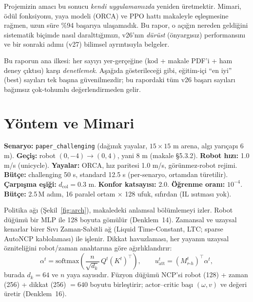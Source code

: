 \documentclass[11pt,a4paper]{article}
\begin{document}
Projemizin amacı bu sonucu \emph{kendi uygulamamızda} yeniden üretmektir. Mimari, ödül fonksiyonu, yaya
modeli (ORCA) ve PPO hattı makaleyle eşleşmesine rağmen, uzun süre \%94 başarıya ulaşamadık. Bu rapor,
o açığın nereden geldiğini sistematik biçimde nasıl daralttığımızı, v26'nın \emph{dürüst} (önyargısız)
performansını ve bir sonraki adımı (v27) bilimsel ayrıntısıyla belgeler.

\begin{kritik}
Bu raporun ana ilkesi: her sayıyı yer-gerçeğine (kod + makale PDF'i + ham deney çıktısı) karşı
\emph{denetlemek}. Aşağıda gösterileceği gibi, eğitim-içi ``en iyi'' (best) sayıları tek başına
güvenilmezdir; bu rapordaki tüm v26 başarı sayıları bağımsız çok-tohumlu değerlendirmeden gelir.
\end{kritik}

\section{Yöntem ve Mimari}

\begin{yontem}
\textbf{Senaryo:} \texttt{paper\_challenging} (dağınık yayalar, $15\times15$ m arena, algı yarıçapı 6 m).
\textbf{Geçiş:} robot $(0,-4)\!\rightarrow\!(0,4)$, yani 8 m (makale §5.3.2). \textbf{Robot hızı:} 1.0 m/s
(unicycle). \textbf{Yayalar:} ORCA, hız paritesi 1.0 m/s, görünmez-robot rejimi. \textbf{Bütçe:}
challenging 50 s, standard 12.5 s (per-senaryo, ortamdan türetilir). \textbf{Çarpışma eşiği:}
$d_{\mathrm{col}}=0.3$ m. \textbf{Konfor katsayısı:} 2.0. \textbf{Öğrenme oranı:} $10^{-4}$.
\textbf{Bütçe:} 2.5\,M adım, 16 paralel ortam $\times$ 128 ufuk, sıfırdan (IL ısıtması yok).
\end{yontem}

Politika ağı (Şekil~\ref{fig:arch}), makaledeki anlamsal bölümlemeyi izler. Robot düğümü bir MLP ile
128 boyuta gömülür (Denklem~14). Zamansal ve uzaysal kenarlar birer Sıvı Zaman-Sabitli ağ (Liquid
Time-Constant, LTC; sparse AutoNCP kablolaması) ile işlenir. Dikkat havuzlaması, her yayanın uzaysal
özniteliğini robot/zaman anahtarına göre ağırlıklandırır:
\begin{equation}
\alpha^t=\mathrm{softmax}\!\left(\frac{n}{\sqrt{d_k}}\,Q^t (K^t)^{\!\top}\right),\qquad
u^t_{\mathrm{att}}=(M^t_{r\text{-}h})^{\!\top}\alpha^t , \tag{Eq.\ 13}
\end{equation}
burada $d_k=64$ ve $n$ yaya sayısıdır. Füzyon düğümü NCP'si robot (128) + zaman (256) + dikkat (256)
$=640$ boyutu birleştirir; actor--critic başı $(\omega,v)$ ve değeri üretir (Denklem~16).
\end{document}
